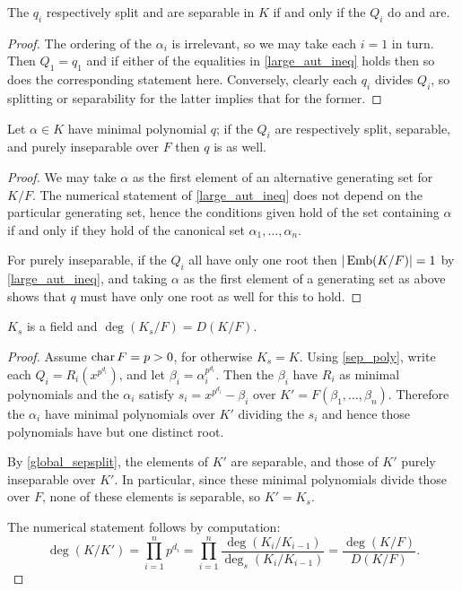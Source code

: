\begin{corollary} The $q_i$ respectively split and are separable in $K$ if and only
if the $Q_i$ do and are.
\label{absolute_sepsplit}
\end{corollary}

\begin{proof} The ordering of the $\alpha_i$ is irrelevant, so we may take
each $i = 1$ in turn.  Then $Q_1 = q_1$ and if either of the equalities in
\cref{large_aut_ineq} holds then so does the corresponding statement here.
Conversely, clearly each $q_i$ divides $Q_i$, so splitting or separability
for the latter implies that for the former. \end{proof}

\begin{corollary} Let $\alpha \in K$ have minimal polynomial $q$; if the $Q_i$ are
respectively split, separable, and purely inseparable over $F$ then $q$ is as
well.
\label{global_sepsplit}
\end{corollary}

\begin{proof} We may take $\alpha$ as the first element of an alternative
generating set for $K/F$.  The numerical statement of \cref{large_aut_ineq}
does not depend on the particular generating set, hence the conditions given
hold of the set containing $\alpha$ if and only if they hold of the canonical
set ${\alpha_1, \dots, \alpha_n}$.

For purely inseparable, if the $Q_i$ all have only one root then $|\operatorname{\text{Emb}}(K/F)|
= 1$ by \cref{large_aut_ineq}, and taking $\alpha$ as the first element of a
generating set as above shows that $q$ must have only one root as well for
this to hold. \end{proof}

\begin{corollary} $K_s$ is a field and $\deg(K_s/F) = D(K/F)$.
\label{sep_subfield}
\end{corollary}

\begin{proof} Assume $\operatorname{\text{char}}{F} = p > 0$, for otherwise $K_s = K$.  Using
\cref{sep_poly}, write each $Q_i = R_i(x^{p^{d_i}})$, and let $\beta_i =
\alpha_i^{p^{d_i}}$.  Then the $\beta_i$ have $R_i$ as minimal polynomials and
the $\alpha_i$ satisfy $s_i = x^{p^{d_i}} - \beta_i$ over $K' = F(\beta_1,
\dots, \beta_n)$.  Therefore the $\alpha_i$ have minimal polynomials over $K'$
dividing the $s_i$ and hence those polynomials have but one distinct root.

By \cref{global_sepsplit}, the elements of $K'$ are separable, and those of
$K'$ purely inseparable over $K'$.  In particular, since these minimal
polynomials divide those over $F$, none of these elements is separable, so $K'
= K_s$.

The numerical statement follows by computation:
\begin{equation*}
\deg(K/K') = \prod_{i = 1}^n p^{d_i}
	= \prod_{i = 1}^n \frac{\deg(K_i/K_{i - 1})}{\deg_s(K_i/K_{i - 1})}
	= \frac{\deg(K/F)}{D(K/F)}. 
	\end{equation*}
\end{proof}

